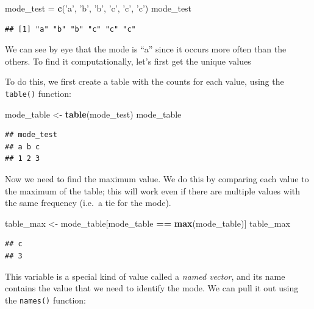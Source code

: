 \documentclass[12pt,]{book}
\newenvironment{Shaded}{\begin{snugshade}}{\end{snugshade}}
\newcommand{\KeywordTok}[1]{\textcolor[rgb]{0.13,0.29,0.53}{\textbf{#1}}}
\newcommand{\NormalTok}[1]{#1}
\newcommand{\OperatorTok}[1]{\textcolor[rgb]{0.81,0.36,0.00}{\textbf{#1}}}
\newcommand{\StringTok}[1]{\textcolor[rgb]{0.31,0.60,0.02}{#1}}
\begin{document}
\begin{Shaded}
\begin{Highlighting}[]
\NormalTok{mode_test =}\StringTok{ }\KeywordTok{c}\NormalTok{(}\StringTok{'a'}\NormalTok{, }\StringTok{'b'}\NormalTok{, }\StringTok{'b'}\NormalTok{, }\StringTok{'c'}\NormalTok{, }\StringTok{'c'}\NormalTok{, }\StringTok{'c'}\NormalTok{)}
\NormalTok{mode_test}
\end{Highlighting}
\end{Shaded}

\begin{verbatim}
## [1] "a" "b" "b" "c" "c" "c"
\end{verbatim}

We can see by eye that the mode is ``a'' since it occurs more often than the others. To find it computationally, let's first get the unique values

To do this, we first create a table with the counts for each value, using the \texttt{table()} function:

\begin{Shaded}
\begin{Highlighting}[]
\NormalTok{mode_table <-}\StringTok{ }\KeywordTok{table}\NormalTok{(mode_test)}
\NormalTok{mode_table}
\end{Highlighting}
\end{Shaded}

\begin{verbatim}
## mode_test
## a b c 
## 1 2 3
\end{verbatim}

Now we need to find the maximum value. We do this by comparing each value to the maximum of the table; this will work even if there are multiple values with the same frequency (i.e.~a tie for the mode).

\begin{Shaded}
\begin{Highlighting}[]
\NormalTok{table_max <-}\StringTok{ }\NormalTok{mode_table[mode_table }\OperatorTok{==}\StringTok{ }\KeywordTok{max}\NormalTok{(mode_table)]}
\NormalTok{table_max}
\end{Highlighting}
\end{Shaded}

\begin{verbatim}
## c 
## 3
\end{verbatim}

This variable is a special kind of value called a \emph{named vector}, and its name contains the value that we need to identify the mode. We can pull it out using the \texttt{names()} function:
\end{document}
